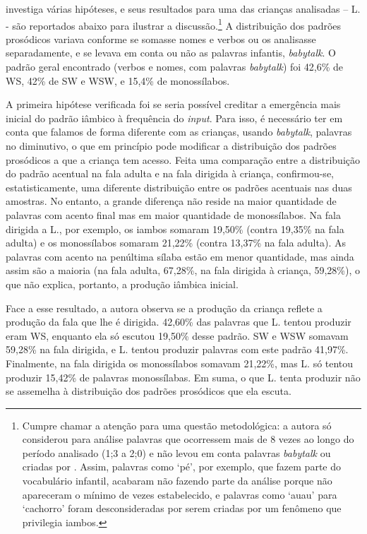 \documentclass[output=paper]{LSP/langsci}
\begin{document}
\citet{santos2007} investiga várias hipóteses, e seus resultados para uma das crianças analisadas – L. -  são reportados abaixo para ilustrar a discussão.\footnote{Cumpre chamar a atenção para uma questão metodológica: a autora só considerou para análise palavras que ocorressem mais de 8 vezes ao longo do período analisado (1;3 a 2;0) e não levou em conta palavras \textit{babytalk} ou criadas por . Assim, palavras como `pé', por exemplo, que fazem parte do vocabulário infantil, acabaram não fazendo parte da análise porque não apareceram o mínimo de vezes estabelecido, e palavras como `auau' para `cachorro' foram desconsideradas por serem criadas por um fenômeno que privilegia iambos.} A distribuição dos padrões prosódicos variava conforme se somasse nomes e verbos ou os analisasse separadamente, e se levava em conta ou não as palavras infantis, \textit{babytalk}. O padrão geral encontrado (verbos e nomes, com palavras \textit{babytalk}) foi 42,6\% de WS, 42\% de SW e WSW, e 15,4\% de monossílabos.


A primeira hipótese verificada foi se seria possível creditar a emergência mais inicial do padrão iâmbico à frequência do \textit{input}. Para isso, é necessário ter em conta que falamos de forma diferente com as crianças, usando \textit{babytalk}, palavras no diminutivo, o que em princípio pode modificar a distribuição dos padrões prosódicos a que a criança tem acesso. Feita uma comparação entre a distribuição do padrão acentual na fala adulta e na fala dirigida à criança, confirmou-se, estatisticamente, uma diferente distribuição entre os padrões acentuais nas duas amostras. No entanto, a grande diferença não reside na maior quantidade de palavras com acento final mas em maior quantidade de monossílabos. Na fala dirigida a L., por exemplo, os iambos somaram 19,50\% (contra 19,35\% na fala adulta) e os monossílabos somaram 21,22\% (contra 13,37\% na fala adulta). As palavras com acento na penúltima sílaba estão em menor quantidade, mas ainda assim são a maioria (na fala adulta, 67,28\%, na fala dirigida à criança, 59,28\%), o que não explica, portanto, a produção iâmbica inicial.

Face a esse resultado, a autora observa se a produção da criança reflete a produção da fala que lhe é dirigida. 42,60\% das palavras que L. tentou produzir eram WS, enquanto ela só escutou 19,50\% desse padrão. SW e WSW somavam 59,28\% na fala dirigida, e L. tentou produzir palavras com este padrão 41,97\%. Finalmente, na fala dirigida os monossílabos somavam 21,22\%, mas L. só tentou produzir 15,42\% de palavras monossílabas. Em suma, o que L. tenta produzir não se assemelha à distribuição dos padrões prosódicos que ela escuta.
\end{document}
